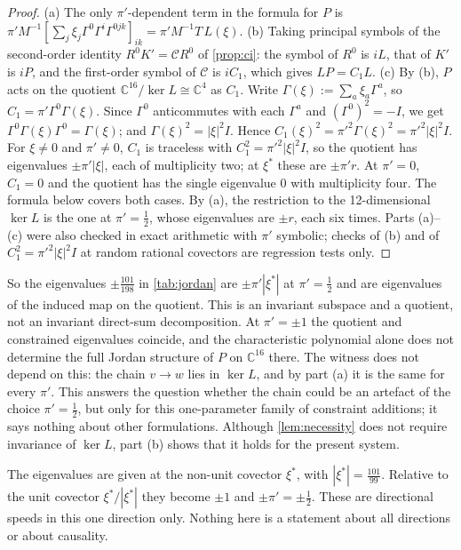 \documentclass[11pt]{article}
\theoremstyle{plain}
\theoremstyle{definition}
\theoremstyle{remark}
\newcommand{\C}{\mathbb{C}}
\newcommand{\Ccal}{\mathcal{C}}
\begin{document}
\begin{proof}
(a) The only $\pi'$-dependent term in the formula for $P$ is $\pi'M^{-1}[\sum_j\xi_j\Gamma^0\Gamma^i\Gamma^{0jk}]_{ik} = \pi'M^{-1}T\,L(\xi)$. (b) Taking principal symbols of the second-order identity $R^0K' = \Ccal R^0$ of \cref{prop:ci}: the symbol of $R^0$ is $iL$, that of $K'$ is $iP$, and the first-order symbol of $\Ccal$ is $iC_1$, which gives $LP = C_1L$. (c) By (b), $P$ acts on the quotient $\C^{16}/\ker L \cong \C^4$ as $C_1$. Write $\Gamma(\xi) := \sum_a\xi_a\Gamma^a$, so $C_1 = \pi'\Gamma^0\Gamma(\xi)$. Since $\Gamma^0$ anticommutes with each $\Gamma^a$ and $(\Gamma^0)^2 = -I$, we get $\Gamma^0\Gamma(\xi)\Gamma^0 = \Gamma(\xi)$; and $\Gamma(\xi)^2 = |\xi|^2I$. Hence $C_1(\xi)^2 = \pi'^2\Gamma(\xi)^2 = \pi'^2|\xi|^2I$. For $\xi \neq 0$ and $\pi' \neq 0$, $C_1$ is traceless with $C_1^2 = \pi'^2|\xi|^2I$, so the quotient has eigenvalues $\pm\pi'|\xi|$, each of multiplicity two; at $\xi^*$ these are $\pm\pi' r$. At $\pi' = 0$, $C_1 = 0$ and the quotient has the single eigenvalue $0$ with multiplicity four. The formula below covers both cases. By (a), the restriction to the 12-dimensional $\ker L$ is the one at $\pi' = \tfrac12$, whose eigenvalues are $\pm r$, each six times. Parts (a)--(c) were also checked in exact arithmetic with $\pi'$ symbolic; checks of (b) and of $C_1^2 = \pi'^2|\xi|^2I$ at random rational covectors are regression tests only.
\end{proof}

So the eigenvalues $\pm\tfrac{101}{198}$ in \cref{tab:jordan} are $\pm\pi'|\xi^*|$ at $\pi' = \tfrac12$ and are eigenvalues of the induced map on the quotient. This is an invariant subspace and a quotient, not an invariant direct-sum decomposition. At $\pi' = \pm1$ the quotient and constrained eigenvalues coincide, and the characteristic polynomial alone does not determine the full Jordan structure of $P$ on $\C^{16}$ there. The witness does not depend on this: the chain $v \to w$ lies in $\ker L$, and by part (a) it is the same for every $\pi'$. This answers the question whether the chain could be an artefact of the choice $\pi' = \tfrac12$, but only for this one-parameter family of constraint additions; it says nothing about other formulations. Although \cref{lem:necessity} does not require invariance of $\ker L$, part (b) shows that it holds for the present system.

The eigenvalues are given at the non-unit covector $\xi^*$, with $|\xi^*| = \tfrac{101}{99}$. Relative to the unit covector $\xi^*/|\xi^*|$ they become $\pm1$ and $\pm\pi' = \pm\tfrac12$. These are directional speeds in this one direction only. Nothing here is a statement about all directions or about causality.
\end{document}
